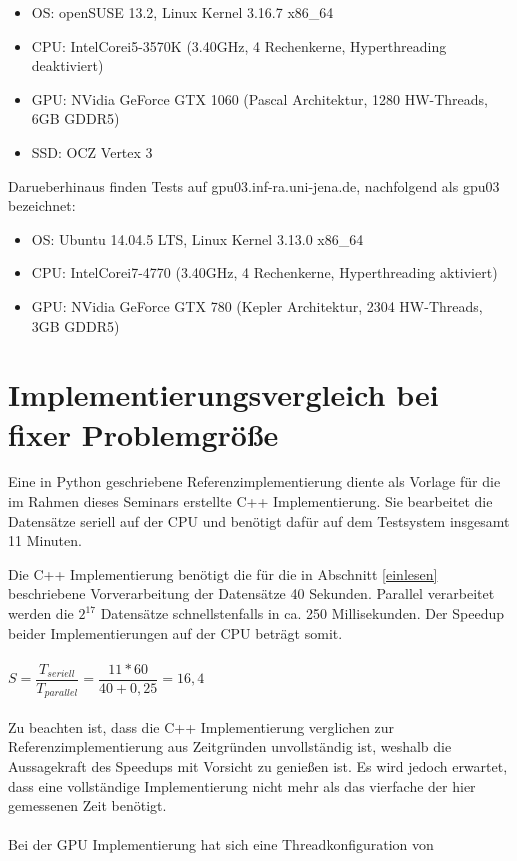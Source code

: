 \begin{itemize}
\item OS: openSUSE 13.2, Linux Kernel 3.16.7 x86\_64
\item CPU: Intel\textregistered Core\texttrademark i5-3570K (3.40GHz, 4 Rechenkerne, Hyperthreading deaktiviert)
\item GPU: NVidia GeForce GTX 1060 (Pascal Architektur, 1280 HW-Threads, 6GB GDDR5)
\item SSD: OCZ Vertex 3
\end{itemize}

Darueberhinaus finden Tests auf gpu03.inf-ra.uni-jena.de, nachfolgend als gpu03 bezeichnet:

\begin{itemize}
\item OS: Ubuntu 14.04.5 LTS, Linux Kernel 3.13.0 x86\_64
\item CPU: Intel\textregistered Core\texttrademark i7-4770 (3.40GHz, 4 Rechenkerne, Hyperthreading aktiviert)
\item GPU: NVidia GeForce GTX 780 (Kepler Architektur, 2304 HW-Threads, 3GB GDDR5)
\end{itemize}

\section{Implementierungsvergleich bei fixer Problemgröße}
Eine in Python geschriebene Referenzimplementierung diente als Vorlage für die im Rahmen dieses Seminars erstellte C++ Implementierung. Sie bearbeitet die Datensätze seriell auf der CPU und benötigt dafür auf dem Testsystem insgesamt 11 Minuten.

Die C++ Implementierung benötigt die für die in Abschnitt \ref{einlesen} beschriebene Vorverarbeitung der Datensätze 40 Sekunden. Parallel verarbeitet werden die $2^{17}$ Datensätze schnellstenfalls in ca. 250 Millisekunden.
Der Speedup beider Implementierungen auf der CPU beträgt somit.
\\\\
$S = \dfrac{T_{seriell}}{T_{parallel}} = \dfrac{11*60}{40+0,25} = 16,4$
\\\\
Zu beachten ist, dass die C++ Implementierung verglichen zur Referenzimplementierung aus Zeitgründen unvollständig ist, weshalb die Aussagekraft des Speedups mit Vorsicht zu genießen ist. Es wird jedoch erwartet, dass eine vollständige Implementierung nicht mehr als das vierfache der hier gemessenen Zeit benötigt.
\\\\
Bei der GPU Implementierung hat sich eine Threadkonfiguration von

